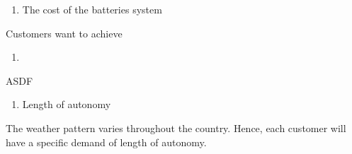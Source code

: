 \begin{enumerate}
    \item The cost of the batteries system
\end{enumerate}
Customers want to achieve
\begin{enumerate}[resume]
    \item 
\end{enumerate}
ASDF
\begin{enumerate}[resume]
    \item Length of autonomy
\end{enumerate}
The weather pattern varies throughout the country. Hence, each customer will have a specific demand of length of autonomy.
